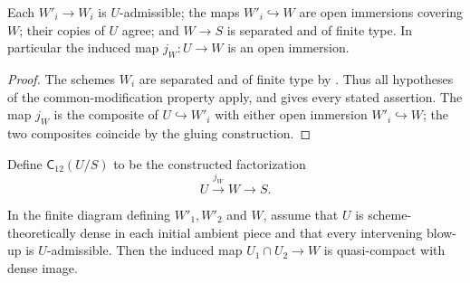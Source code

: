 \begin{lemma}
  \label{lemma:nagata-two-open-final-modification}
  \leanok

  Each $W'_i\to W_i$ is $U$-admissible; the maps $W'_i\hookrightarrow W$
  are open immersions covering $W$; their copies of $U$ agree; and $W\to S$
  is separated and of finite type.  In particular the induced map
  $j_W\colon U\to W$ is an open immersion.
\end{lemma}

\begin{proof}
  \leanok
  The schemes $W_i$ are separated and of finite type by
  .  Thus all hypotheses of the
  common-modification property apply, and
   gives every stated assertion.
  The map $j_W$ is the composite of $U\hookrightarrow W'_i$ with either open
  immersion $W'_i\hookrightarrow W$; the two composites coincide by the
  gluing construction.
\end{proof}

\begin{definition}
  \label{def:nagata-two-open-compactification-candidate}
  \leanok

  Define $\mathsf C_{12}(U/S)$ to be the constructed factorization
  \[
    U\xrightarrow{j_W}W\longrightarrow S.
  \]
\end{definition}

\begin{lemma}
  \label{lemma:nagata-two-open-density-transport}
  \leanok

  In the finite diagram defining $W'_1,W'_2$ and $W$, assume that $U$ is
  scheme-theoretically dense in each initial ambient piece and that every
  intervening blow-up is $U$-admissible.  Then the induced map
  $U_1\cap U_2\to W$ is quasi-compact with dense image.
\end{lemma}

